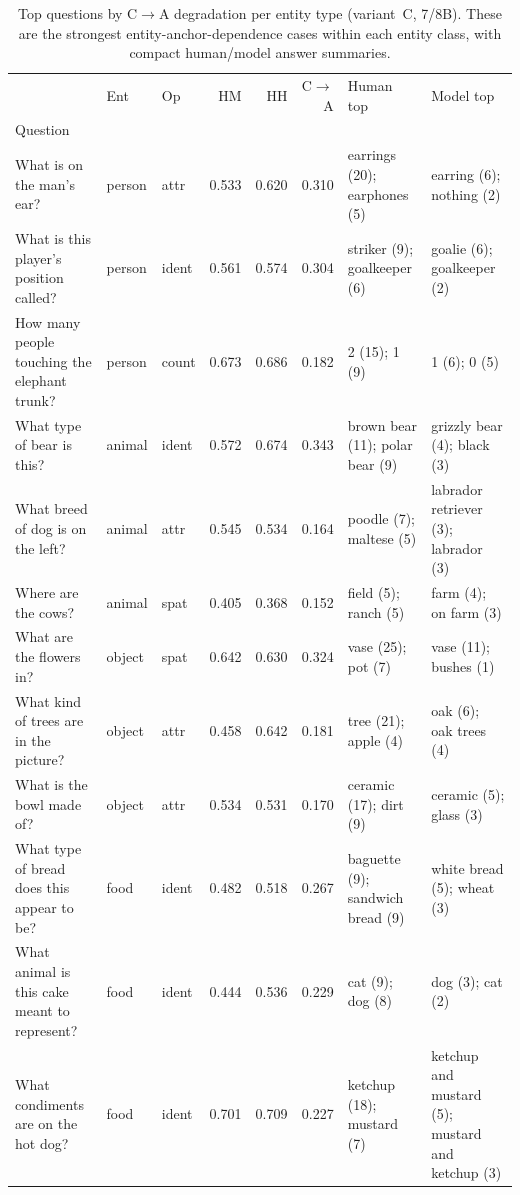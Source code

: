 \begin{table}[t]
\centering
\caption{Top questions by C$\to$A degradation per entity type (variant~C, 7/8B). These are the strongest entity-anchor-dependence cases within each entity class, with compact human/model answer summaries.}
\label{tab:qual_entity_answers}
\small
\setlength{\tabcolsep}{4pt}
\begin{tabular}{p{4.0cm}llrrrp{2.6cm}p{2.6cm}}
\toprule
 & Ent & Op & HM & HH & C$\to$A & Human top & Model top \\
Question &  &  &  &  &  &  &  \\
\midrule
What is on the man's ear? & person & attr & 0.533 & 0.620 & 0.310 & earrings (20); earphones (5) & earring (6); nothing (2) \\
What is this player's position called? & person & ident & 0.561 & 0.574 & 0.304 & striker (9); goalkeeper (6) & goalie (6); goalkeeper (2) \\
How many people touching the elephant trunk? & person & count & 0.673 & 0.686 & 0.182 & 2 (15); 1 (9) & 1 (6); 0 (5) \\
What type of bear is this? & animal & ident & 0.572 & 0.674 & 0.343 & brown bear (11); polar bear (9) & grizzly bear (4); black (3) \\
What breed of dog is on the left? & animal & attr & 0.545 & 0.534 & 0.164 & poodle (7); maltese (5) & labrador retriever (3); labrador (3) \\
Where are the cows? & animal & spat & 0.405 & 0.368 & 0.152 & field (5); ranch (5) & farm (4); on farm (3) \\
What are the flowers in? & object & spat & 0.642 & 0.630 & 0.324 & vase (25); pot (7) & vase (11); bushes (1) \\
What kind of trees are in the picture? & object & attr & 0.458 & 0.642 & 0.181 & tree (21); apple (4) & oak (6); oak trees (4) \\
What is the bowl made of? & object & attr & 0.534 & 0.531 & 0.170 & ceramic (17); dirt (9) & ceramic (5); glass (3) \\
What type of bread does this appear to be? & food & ident & 0.482 & 0.518 & 0.267 & baguette (9); sandwich bread (9) & white bread (5); wheat (3) \\
What animal is this cake meant to represent? & food & ident & 0.444 & 0.536 & 0.229 & cat (9); dog (8) & dog (3); cat (2) \\
What condiments are on the hot dog? & food & ident & 0.701 & 0.709 & 0.227 & ketchup (18); mustard (7) & ketchup and mustard (5); mustard and ketchup (3) \\
\bottomrule
\end{tabular}
\end{table}
